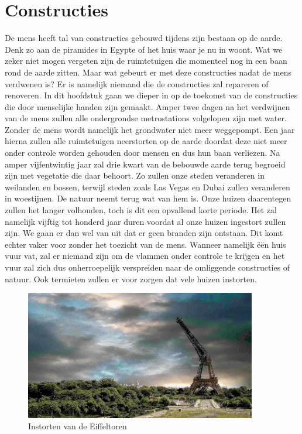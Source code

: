\section{Constructies}
De mens heeft tal van constructies gebouwd tijdens zijn bestaan op de aarde. Denk zo aan de piramides in Egypte of het huis waar je nu in woont. Wat we zeker niet mogen vergeten zijn de ruimtetuigen die momenteel nog in een baan rond de aarde zitten. Maar wat gebeurt er met deze constructies nadat de mens verdwenen is? Er is namelijk niemand die de constructies zal repareren of renoveren. In dit hoofdstuk gaan we dieper in op de toekomst van de constructies die door menselijke handen zijn gemaakt.
\newline
\newline
Amper twee dagen na het verdwijnen van de mens zullen alle ondergrondse metrostations volgelopen zijn met water. Zonder de mens wordt namelijk het grondwater niet meer weggepompt. Een jaar hierna zullen alle ruimtetuigen neerstorten op de aarde doordat deze niet meer onder controle worden gehouden door mensen en dus hun baan verliezen. \cite{LAPOutbreak}
\newline
Na amper vijfentwintig jaar zal drie kwart van de bebouwde aarde terug begroeid zijn met vegetatie die daar behoort. Zo zullen onze steden veranderen in weilanden en bossen, terwijl steden zoals Las Vegas en Dubai zullen veranderen in woestijnen. De natuur neemt terug wat van hem is. \cite{ASAPScience, LAPOutbreak}
\newline
Onze huizen daarentegen zullen het langer volhouden, toch is dit een opvallend korte periode. Het zal namelijk vijftig tot honderd jaar duren voordat al onze huizen ingestort zullen zijn. We gaan er dan wel van uit dat er geen branden zijn ontstaan. Dit komt echter vaker voor zonder het toezicht van de mens. Wanneer namelijk \"{e}\"{e}n huis vuur vat, zal er niemand zijn om de vlammen onder controle te krijgen en het vuur zal zich dus onherroepelijk verspreiden naar de omliggende constructies of natuur. Ook termieten zullen er voor zorgen dat vele huizen instorten. \cite{ASAPScience,LAPOutbreak}
\newline
\begin{figure}
	\centering
	\includegraphics[width=0.9\textwidth]{EiffelToren.png}
	\caption{Instorten van de Eiffeltoren \cite{LAPOutbreak}}
	\label{fig:eiffel}
\end{figure}

